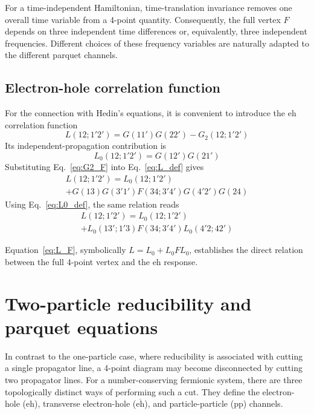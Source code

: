 \documentclass[aip,jcp,reprint,noshowkeys,superscriptaddress]{revtex4-1}
\newcommand{\eh}{\text{eh}}
\newcommand{\teh}{\overline{\text{eh}}}
\newcommand{\pp}{\text{pp}}
\begin{document}
For a time-independent Hamiltonian, time-translation invariance removes
one overall time variable from a 4-point quantity.
Consequently, the full vertex $F$ depends on three independent time
differences or, equivalently, three independent frequencies.
Different choices of these frequency variables are naturally adapted to
the different parquet channels.

\subsection{Electron-hole correlation function}

For the connection with Hedin's equations, it is convenient to introduce
the $\eh$ correlation function
\begin{equation}
	L(12;1'2')
	=
	G(11')G(22')
	-
	G_2(12;1'2')
	\label{eq:L_def}
\end{equation}
Its independent-propagation contribution is
\begin{equation}
	L_0(12;1'2')
	=
	G(12')G(21')
	\label{eq:L0_def}
\end{equation}
Substituting Eq.~\eqref{eq:G2_F} into Eq.~\eqref{eq:L_def} gives
\begin{multline}
	L(12;1'2')
	=
	L_0(12;1'2')
	\\
	+
	G(13)
	G(3'1')
	F(34;3'4')
	G(4'2')
	G(24)
	\label{eq:L_F_explicit}
\end{multline}
Using Eq.~\eqref{eq:L0_def}, the same relation reads
\begin{multline}
	L(12;1'2')
	=
	L_0(12;1'2')
	\\
	+
	L_0(13';1'3)
	F(34;3'4')
	L_0(4'2;42')
	\label{eq:L_F}
\end{multline}

Equation~\eqref{eq:L_F}, symbolically $L=L_0+L_0FL_0$, establishes the
direct relation between the full 4-point vertex and the $\eh$ response.

\section{Two-particle reducibility and parquet equations}
\label{sec:parquet}

In contrast to the one-particle case, where reducibility is associated
with cutting a single propagator line, a 4-point diagram may become
disconnected by cutting two propagator lines.
For a number-conserving fermionic system, there are three topologically
distinct ways of performing such a cut.
They define the electron-hole ($\eh$), transverse electron-hole
($\teh$), and particle-particle ($\pp$) channels.
\end{document}
